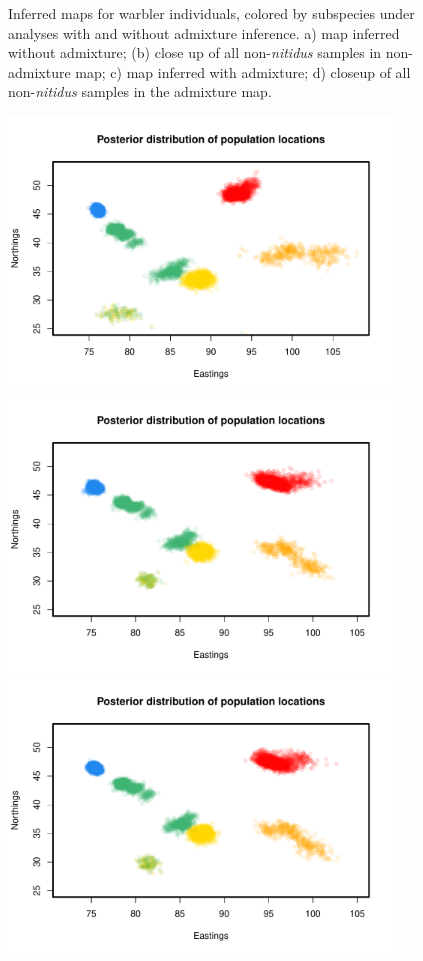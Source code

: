 \documentclass[12pt]{article}
\begin{document}
\begin{figure}
	\caption{
    Inferred maps for warbler individuals, colored by subspecies under analyses with and without admixture inference. a) map inferred without admixture; (b) close up of all non-\textit{nitidus} samples in non-admixture map; c) map inferred with admixture; d) closeup of all non-\textit{nitidus} samples in the admixture map.}\label{sfig:warbler_ind_maps_compare}
\end{figure}

\begin{figure}
	\centering
			{\includegraphics[width=4in,height=2.88in]{figs/warblers/warb_inds_ad_post_map_randpr2.pdf}}
			{\includegraphics[width=4in,height=2.88in]{figs/warblers/warb_inds_ad_post_map_realpr1.pdf}}
			{\includegraphics[width=4in,height=2.88in]{figs/warblers/warb_inds_ad_post_map_realpr2.pdf}}

\end{figure}
\end{document}
